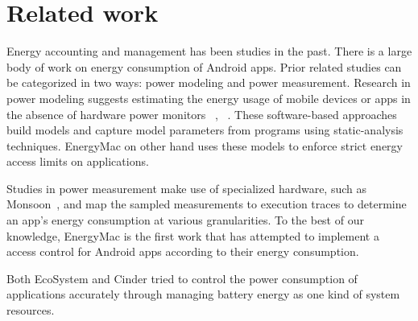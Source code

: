 \section{Related work}
\label{related}

Energy accounting and management has been studies in the past.
There is a large body of work on energy consumption of Android apps. Prior related studies can be categorized in two ways: power modeling and power measurement. Research in power modeling suggests estimating the energy usage of mobile devices or apps in the absence of hardware power
monitors ~\cite{hao2013estimating}, ~\cite{li2013calculating}. These software-based approaches build models and capture model parameters from programs using static-analysis techniques. EnergyMac on other hand uses these models to enforce strict energy access limits on applications.

Studies in power measurement make use of specialized hardware, such as Monsoon~\cite{yoon2012appscope}, and map the sampled measurements to execution traces to determine an app's energy consumption at various granularities. To the best of our knowledge, EnergyMac is the first work that has attempted to implement a access control for Android apps according to their energy consumption. 

Both EcoSystem and Cinder tried to control the power consumption of applications accurately through managing battery energy as one kind of system resources.









